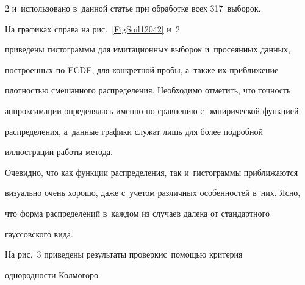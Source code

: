 \begin{multicols}{2}
и~использовано в~данной статье при обработке всех 317~выборок.














На графиках справа на рис.~\ref{FigSoil12042} и~2 


приведены гистограммы для имитационных выборок и~просеянных данных, 


построенных по ECDF, для конкретной пробы, а~также их приближение 


плотностью смешанного распределения. Необходимо отметить, что точность 


аппроксимации определялась именно по сравнению с~эмпирической функцией 


распределения, а~данные графики служат лишь для более подробной 


иллюстрации работы метода.





Очевидно, что как функции распределения, так и~гистограммы приближаются 


визуально очень хорошо, даже с~учетом различных особенностей в~них. Ясно, 


что форма распределений в~каждом из случаев далека от стандартного 


гауссовского вида.





На рис.~3 приведены результаты проверки\linebreak с~помощью критерия 


однородности Колмогоро-\linebreak\vspace*{-10pt}





\pagebreak





\end{multicols}





